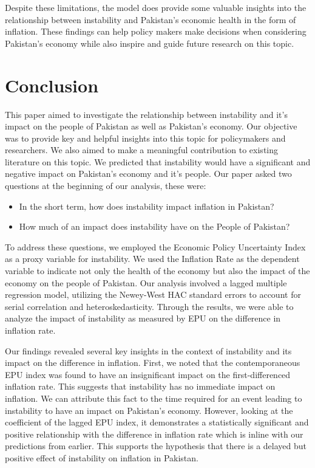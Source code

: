 \documentclass[11pt]{article}
\begin{document}
Despite these limitations, the model does provide some valuable insights into the relationship between instability and Pakistan’s economic health in the form of inflation. These findings can help policy makers make decisions when considering Pakistan’s economy while also inspire and guide future research on this topic.

\section{Conclusion}

This paper aimed to investigate the relationship between instability and it’s impact on the people of Pakistan as well as Pakistan’s economy. Our objective was to provide key and helpful insights into this topic for policymakers and researchers. We also aimed to make a meaningful contribution to existing literature on this topic. We predicted that instability would have a significant and negative impact on Pakistan’s economy and it’s people. Our paper asked two questions at the beginning of our analysis, these were:
\begin{itemize}
    \item In the short term, how does instability impact inflation in Pakistan?
    \item How much of an impact does instability have on the People of Pakistan?
\end{itemize}

To address these questions, we employed the Economic Policy Uncertainty Index as a proxy variable for instability. We used the Inflation Rate as the dependent variable to indicate not only the health of the economy but also the impact of the economy on the people of Pakistan. Our analysis involved a lagged multiple regression model, utilizing the Newey-West HAC standard errors to account for serial correlation and heteroskedasticity. Through the results, we were able to analyze the impact of instability as measured by EPU on the difference in inflation rate. \newline

Our findings revealed several key insights in the context of instability and its impact on the difference in inflation. First, we noted that the contemporaneous EPU index was found to have an insignificant impact on the first-differenced inflation rate. This suggests that instability has no immediate impact on inflation. We can attribute this fact to the time required for an event leading to instability to have an impact on Pakistan’s economy. However, looking at the coefficient of the lagged EPU index, it demonstrates a statistically significant and positive relationship with the difference in inflation rate which is inline with our predictions from earlier. This supports the hypothesis that there is a delayed but positive effect of instability on inflation in Pakistan. \newline
\end{document}
